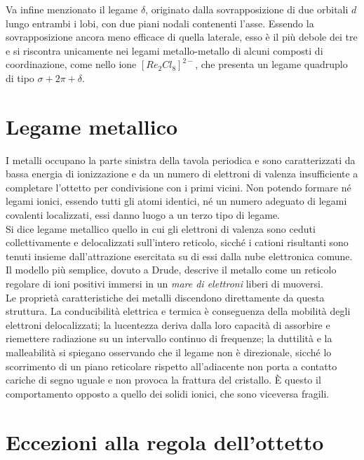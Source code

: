 Va infine menzionato il legame $\delta$, originato dalla sovrapposizione di due orbitali $d$ lungo entrambi i lobi, con due piani nodali contenenti l'asse. Essendo la sovrapposizione ancora meno efficace di quella laterale, esso è il più debole dei tre e si riscontra unicamente nei legami metallo-metallo di alcuni composti di coordinazione, come nello ione $[Re_2Cl_8]^{2-}$, che presenta un legame quadruplo di tipo $\sigma + 2\pi + \delta$.

\section{Legame metallico}

I metalli occupano la parte sinistra della tavola periodica e sono caratterizzati da bassa energia di ionizzazione e da un numero di elettroni di valenza insufficiente a completare l'ottetto per condivisione con i primi vicini. 
Non potendo formare né legami ionici, essendo tutti gli atomi identici, né un numero adeguato di legami covalenti localizzati, essi danno luogo a un terzo tipo di legame.\\

Si dice legame metallico quello in cui gli elettroni di valenza sono ceduti collettivamente e delocalizzati sull'intero reticolo, sicché i cationi risultanti sono tenuti insieme dall'attrazione esercitata su di essi dalla nube elettronica comune.\\

Il modello più semplice, dovuto a Drude, descrive il metallo come un reticolo regolare di ioni positivi immersi in un \emph{mare di elettroni} liberi di muoversi.\\

Le proprietà caratteristiche dei metalli discendono direttamente da questa struttura. 
La conducibilità elettrica e termica è conseguenza della mobilità degli elettroni delocalizzati; la lucentezza deriva dalla loro capacità di assorbire e riemettere radiazione su un intervallo continuo di frequenze; la duttilità e la malleabilità si spiegano osservando che il legame non è direzionale, sicché lo scorrimento di un piano reticolare rispetto all'adiacente non porta a contatto cariche di segno uguale e non provoca la frattura del cristallo. È questo il comportamento opposto a quello dei solidi ionici, che sono viceversa fragili.

\section{Eccezioni alla regola dell'ottetto}

